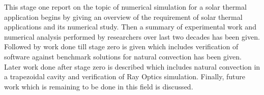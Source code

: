 \begin{Abstract}
This stage one report on the topic of numerical simulation for a solar thermal application begins by giving an overview of the requirement of solar thermal applications and its numerical study. Then a summary of experimental work and numerical analysis performed by researchers over last two decades has been given. Followed by work done till stage zero is given which includes verification of software against benchmark solutions for natural convection has been given. Later work done after stage zero is described which includes natural convection in a trapezoidal cavity and verification of Ray Optics simulation. Finally, future work which is remaining to be done in this field is discussed.
%
%
%
%
%
\end{Abstract}


